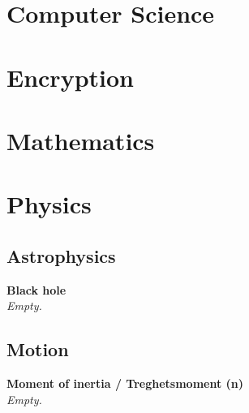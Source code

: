 \documentclass[12pt]{report}
\begin{document}
\setlength{\parskip}{1.5em}   %
\setlength\parindent{0pt}   %


\chapter{Computer Science}



















\chapter{Encryption}









\chapter{Mathematics}






\chapter{Physics}
\section{Astrophysics}
\textbf{Black hole} \\
\textit{Empty.}

\section{Motion}
\textbf{Moment of inertia / Treghetsmoment (n)} \\
\textit{Empty.}

    





\printindex


\raggedright                    %
\sloppy
\printbibliography[heading=bibintoc,title={Bibliography}]
\end{document}
